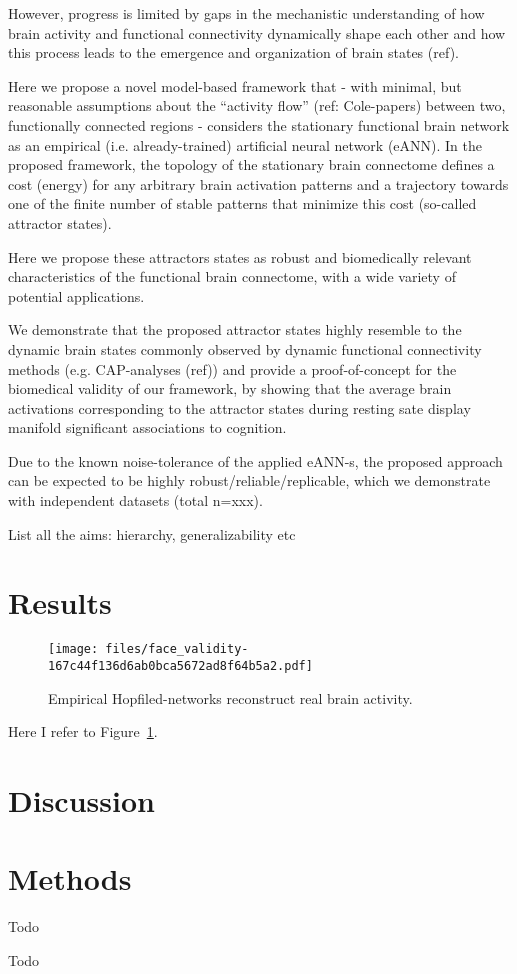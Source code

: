 \documentclass[twocolumn, switch]{article}
\begin{document}
However, progress is limited by gaps in the mechanistic understanding of how brain activity and functional connectivity dynamically shape each other and how this process leads to the emergence and organization of brain states (ref).

Here we propose a novel model-based framework that - with minimal, but reasonable assumptions about the ``activity flow'' (ref: Cole-papers) between two, functionally connected regions - considers the stationary functional brain network as an empirical (i.e. already-trained) artificial neural network (eANN). In the proposed framework, the topology of the stationary brain connectome defines a cost (energy) for any arbitrary brain activation patterns and a trajectory towards one of the finite number of stable patterns that minimize this cost (so-called attractor states).

Here we propose these attractors states as robust and biomedically relevant characteristics of the functional brain connectome, with a wide variety of potential applications.

We demonstrate that the proposed attractor states highly resemble to the dynamic brain states commonly observed by dynamic functional connectivity methods (e.g. CAP-analyses (ref)) and provide a proof-of-concept for the biomedical validity of our framework, by showing that the average brain activations corresponding to the attractor states during resting sate display manifold significant associations to cognition.

Due to the known noise-tolerance of the applied eANN-s, the proposed approach can be expected to be highly robust/reliable/replicable, which we demonstrate with independent datasets (total n=xxx).

List all the aims: hierarchy, generalizability etc

\section{Results}\label{Results}

\begin{figure}[!htbp]
\centering
\texttt{[image: files/face\_validity-167c44f136d6ab0bca5672ad8f64b5a2.pdf]}
\caption{Empirical Hopfiled-networks reconstruct real brain activity.}
\label{face-val}
\end{figure}

Here I refer to Figure~\ref{face-val}.

\section{Discussion}\label{Discussion}

\section{Methods}\label{Methods}

Todo

Todo




\end{document}
